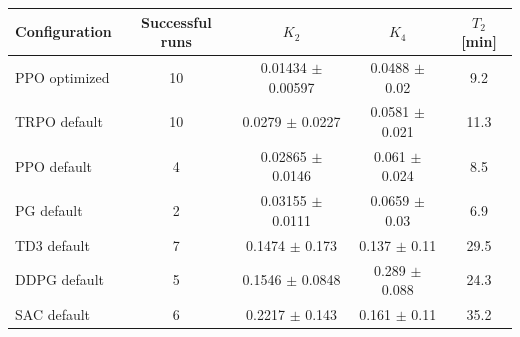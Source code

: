 \begin{tabular}{lcccc}
\toprule
Configuration & Successful runs & $K_2$ & $K_4$ & $T_2$ [min] \\
\midrule
PPO optimized & 10 & 0.01434 $\pm$ 0.00597 & 0.0488 $\pm$ 0.02 & 9.2 \\
TRPO default & 10 & 0.0279 $\pm$ 0.0227 & 0.0581 $\pm$ 0.021 & 11.3 \\
PPO default & 4 & 0.02865 $\pm$ 0.0146 & 0.061 $\pm$ 0.024 & 8.5 \\
PG default & 2 & 0.03155 $\pm$ 0.0111 & 0.0659 $\pm$ 0.03 & 6.9 \\
TD3 default & 7 & 0.1474 $\pm$ 0.173 & 0.137 $\pm$ 0.11 & 29.5 \\
DDPG default & 5 & 0.1546 $\pm$ 0.0848 & 0.289 $\pm$ 0.088 & 24.3 \\
SAC default & 6 & 0.2217 $\pm$ 0.143 & 0.161 $\pm$ 0.11 & 35.2 \\
\bottomrule
\end{tabular}
